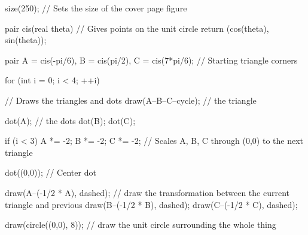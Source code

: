 \documentclass[11pt, a4paper]{article}
\begin{document}
	
	\begin{titlepage}
		\vspace*{3in}
		\begin{center}
			\begin{minipage}[c]{0.1\textwidth}
				\centering
				\begin{asy}
				size(250); // Sets the size of the cover page figure
				
				pair cis(real theta) { // Gives points on the unit circle
				return (cos(theta), sin(theta));
				}
				
				pair A = cis(-pi/6), B = cis(pi/2), C = cis(7*pi/6); // Starting triangle corners
				
				for (int i = 0; i < 4; ++i) { // Draws the triangles and dots
				draw(A--B--C--cycle); // the triangle
				
				dot(A); // the dots
				dot(B);
				dot(C);
				
				if (i < 3) {
				A *= -2; B *= -2; C *= -2; // Scales A, B, C through (0,0) to the next triangle
				}
				}
				
				dot((0,0)); // Center dot
				
				draw(A--(-1/2 * A), dashed); // draw the transformation between the current triangle and previous
				draw(B--(-1/2 * B), dashed);
				draw(C--(-1/2 * C), dashed);
				
				draw(circle((0,0), 8)); // draw the unit circle surrounding the whole thing
				\end{asy}
			\end{minipage}
			\hfill
			\begin{minipage}[c]{0.5\textwidth}
				\fontsize{24}{24}
				
				\vspace*{0.25em}
				
				\fontsize{18}{18}\\
				
				\fontsize{16}{16}
			\end{minipage}
		\end{center}
	\end{titlepage}
	
	
\end{document}

